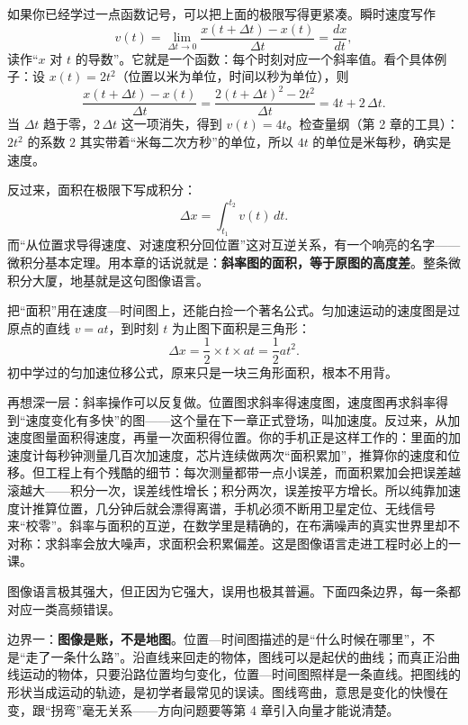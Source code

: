 \begin{mathbridge}
如果你已经学过一点函数记号，可以把上面的极限写得更紧凑。瞬时速度写作
\[
v(t)=\lim_{\Delta t\to 0}\frac{x(t+\Delta t)-x(t)}{\Delta t}=\frac{dx}{dt},
\]
读作“\(x\) 对 \(t\) 的导数”。它就是一个函数：每个时刻对应一个斜率值。看个具体例子：设 \(x(t)=2t^{2}\)（位置以米为单位，时间以秒为单位），则
\[
\frac{x(t+\Delta t)-x(t)}{\Delta t}=\frac{2(t+\Delta t)^{2}-2t^{2}}{\Delta t}=4t+2\,\Delta t.
\]
当 \(\Delta t\) 趋于零，\(2\,\Delta t\) 这一项消失，得到 \(v(t)=4t\)。检查量纲（第 2 章的工具）：\(2t^{2}\) 的系数 \(2\) 其实带着“米每二次方秒”的单位，所以 \(4t\) 的单位是米每秒，确实是速度。

反过来，面积在极限下写成积分：
\[
\Delta x=\int_{t_1}^{t_2} v(t)\,dt.
\]
而“从位置求导得速度、对速度积分回位置”这对互逆关系，有一个响亮的名字——微积分基本定理。用本章的话说就是：\textbf{斜率图的面积，等于原图的高度差}。整条微积分大厦，地基就是这句图像语言。
\end{mathbridge}

\begin{challenge}
把“面积”用在速度—时间图上，还能白捡一个著名公式。匀加速运动的速度图是过原点的直线 \(v=at\)，到时刻 \(t\) 为止图下面积是三角形：
\[
\Delta x=\frac{1}{2}\times t\times at=\frac{1}{2}at^{2}.
\]
初中学过的匀加速位移公式，原来只是一块三角形面积，根本不用背。

再想深一层：斜率操作可以反复做。位置图求斜率得速度图，速度图再求斜率得到“速度变化有多快”的图——这个量在下一章正式登场，叫加速度。反过来，从加速度图量面积得速度，再量一次面积得位置。你的手机正是这样工作的：里面的加速度计每秒钟测量几百次加速度，芯片连续做两次“面积累加”，推算你的速度和位移。但工程上有个残酷的细节：每次测量都带一点小误差，而面积累加会把误差越滚越大——积分一次，误差线性增长；积分两次，误差按平方增长。所以纯靠加速度计推算位置，几分钟后就会漂得离谱，手机必须不断用卫星定位、无线信号来“校零”。斜率与面积的互逆，在数学里是精确的，在布满噪声的真实世界里却不对称：求斜率会放大噪声，求面积会积累偏差。这是图像语言走进工程时必上的一课。
\end{challenge}


图像语言极其强大，但正因为它强大，误用也极其普遍。下面四条边界，每一条都对应一类高频错误。

边界一：\textbf{图像是账，不是地图}。位置—时间图描述的是“什么时候在哪里”，不是“走了一条什么路”。沿直线来回走的物体，图线可以是起伏的曲线；而真正沿曲线运动的物体，只要沿路位置均匀变化，位置—时间图照样是一条直线。把图线的形状当成运动的轨迹，是初学者最常见的误读。图线弯曲，意思是变化的快慢在变，跟“拐弯”毫无关系——方向问题要等第 4 章引入向量才能说清楚。

